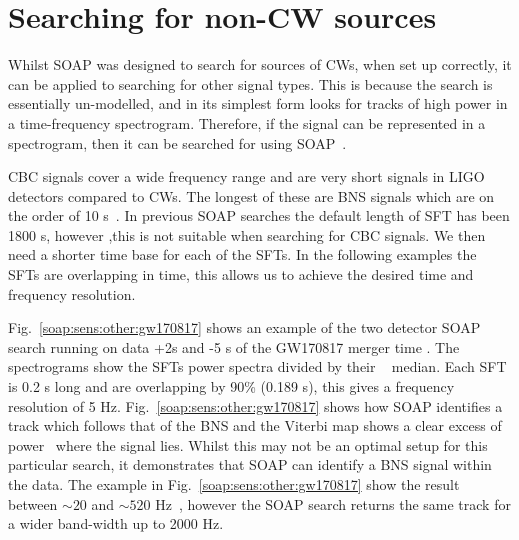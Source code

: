 \section{\label{soap:sens:other} Searching for non-CW sources}

Whilst SOAP was designed to search for sources of \glspl{CW}, when set up correctly, it can be applied to searching for other signal types.
This is because the search is essentially un-modelled, and in its simplest form looks for tracks of high power in a time-frequency spectrogram.
Therefore, if the signal can be represented in a spectrogram, then it can be
searched for using SOAP~.

CBC signals cover a wide frequency range and are very short signals in \gls{LIGO} detectors compared to \glspl{CW}. 
The longest of these are \gls{BNS} signals which are on the order of 10
s~. 
In previous SOAP searches the default length of \gls{SFT} has been 1800 s, however ,this is not suitable when searching for \gls{CBC} signals.
We then need a shorter time base for each of the \glspl{SFT}.
In the following examples the \glspl{SFT} are overlapping in time, this allows us to achieve the desired time and frequency resolution.
~

Fig.~\ref{soap:sens:other:gw170817} shows an example of the two detector SOAP search running on data +2s and -5 s of the GW170817 merger time \citep{abbott2017GW170817Observation}. 
The spectrograms show the \glspl{SFT} power spectra divided by their
~ median.
Each \gls{SFT} is 0.2 s long and are overlapping by 90\% (0.189 s), this gives a frequency resolution of 5 Hz. 
Fig.~\ref{soap:sens:other:gw170817} shows how SOAP identifies a track which
follows that of the \gls{BNS} and the Viterbi map shows a clear excess of power
~where the signal lies.
Whilst this may not be an optimal setup for this particular search, it demonstrates that SOAP can identify a \gls{BNS} signal within the data. 
The example in Fig.~\ref{soap:sens:other:gw170817} show the result between
$\sim 20$ and $\sim 520$ Hz~, however the SOAP search returns the same track
for a wider band-width up to 2000 Hz.~ 


